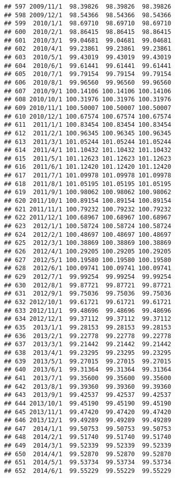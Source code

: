 \documentclass[
]{article}
\begin{document}
\begin{verbatim}
## 597 2009/11/1  98.39826  98.39826  98.39826
## 598 2009/12/1  98.54366  98.54366  98.54366
## 599  2010/1/1  98.69710  98.69710  98.69710
## 600  2010/2/1  98.86415  98.86415  98.86415
## 601  2010/3/1  99.04681  99.04681  99.04681
## 602  2010/4/1  99.23861  99.23861  99.23861
## 603  2010/5/1  99.43019  99.43019  99.43019
## 604  2010/6/1  99.61441  99.61441  99.61441
## 605  2010/7/1  99.79154  99.79154  99.79154
## 606  2010/8/1  99.96560  99.96560  99.96560
## 607  2010/9/1 100.14106 100.14106 100.14106
## 608 2010/10/1 100.31976 100.31976 100.31976
## 609 2010/11/1 100.50007 100.50007 100.50007
## 610 2010/12/1 100.67574 100.67574 100.67574
## 611  2011/1/1 100.83454 100.83454 100.83454
## 612  2011/2/1 100.96345 100.96345 100.96345
## 613  2011/3/1 101.05244 101.05244 101.05244
## 614  2011/4/1 101.10432 101.10432 101.10432
## 615  2011/5/1 101.12623 101.12623 101.12623
## 616  2011/6/1 101.12420 101.12420 101.12420
## 617  2011/7/1 101.09978 101.09978 101.09978
## 618  2011/8/1 101.05195 101.05195 101.05195
## 619  2011/9/1 100.98062 100.98062 100.98062
## 620 2011/10/1 100.89154 100.89154 100.89154
## 621 2011/11/1 100.79232 100.79232 100.79232
## 622 2011/12/1 100.68967 100.68967 100.68967
## 623  2012/1/1 100.58724 100.58724 100.58724
## 624  2012/2/1 100.48697 100.48697 100.48697
## 625  2012/3/1 100.38869 100.38869 100.38869
## 626  2012/4/1 100.29205 100.29205 100.29205
## 627  2012/5/1 100.19580 100.19580 100.19580
## 628  2012/6/1 100.09741 100.09741 100.09741
## 629  2012/7/1  99.99254  99.99254  99.99254
## 630  2012/8/1  99.87721  99.87721  99.87721
## 631  2012/9/1  99.75036  99.75036  99.75036
## 632 2012/10/1  99.61721  99.61721  99.61721
## 633 2012/11/1  99.48696  99.48696  99.48696
## 634 2012/12/1  99.37112  99.37112  99.37112
## 635  2013/1/1  99.28153  99.28153  99.28153
## 636  2013/2/1  99.22778  99.22778  99.22778
## 637  2013/3/1  99.21442  99.21442  99.21442
## 638  2013/4/1  99.23295  99.23295  99.23295
## 639  2013/5/1  99.27015  99.27015  99.27015
## 640  2013/6/1  99.31364  99.31364  99.31364
## 641  2013/7/1  99.35600  99.35600  99.35600
## 642  2013/8/1  99.39360  99.39360  99.39360
## 643  2013/9/1  99.42537  99.42537  99.42537
## 644 2013/10/1  99.45190  99.45190  99.45190
## 645 2013/11/1  99.47420  99.47420  99.47420
## 646 2013/12/1  99.49289  99.49289  99.49289
## 647  2014/1/1  99.50753  99.50753  99.50753
## 648  2014/2/1  99.51740  99.51740  99.51740
## 649  2014/3/1  99.52339  99.52339  99.52339
## 650  2014/4/1  99.52870  99.52870  99.52870
## 651  2014/5/1  99.53734  99.53734  99.53734
## 652  2014/6/1  99.55229  99.55229  99.55229

\end{verbatim}
\end{document}
